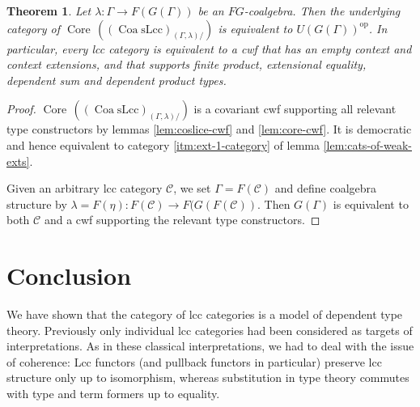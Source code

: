 \documentclass[a4paper]{article}
\newtheorem{theorem}{Theorem}
\theoremstyle{remark}
\theoremstyle{definition}
\begin{document}
\begin{theorem}
  \label{th:context-as-model}
  Let $\lambda : \Gamma \rightarrow F(G(\Gamma))$ be an $FG$-coalgebra.
  Then the underlying category of $\operatorname{Core} \, ((\operatorname{Coa} \mathrm{sLcc})_{(\Gamma, \lambda) /})$ is equivalent to $U(G(\Gamma))^\mathrm{op}$.
  In particular, every lcc category is equivalent to a cwf that has an empty context and context extensions, and that supports finite product, extensional equality, dependent sum and dependent product types.
\end{theorem}
\begin{proof}
  $\operatorname{Core} \, ((\operatorname{Coa} \mathrm{sLcc})_{(\Gamma, \lambda) /})$ is a covariant cwf supporting all relevant type constructors by lemmas \ref{lem:coslice-cwf} and \ref{lem:core-cwf}.
  It is democratic and hence equivalent to category \ref{itm:ext-1-category} of lemma \ref{lem:cats-of-weak-exts}.

  Given an arbitrary lcc category $\mathcal{C}$, we set $\Gamma = F(\mathcal{C})$ and define coalgebra structure by $\lambda = F(\eta) : F(\mathcal{C}) \rightarrow F(G(F(\mathcal{C}))$.
  Then $G(\Gamma)$ is equivalent to both $\mathcal{C}$ and a cwf supporting the relevant type constructors.
\end{proof}

\section{Conclusion}

We have shown that the category of lcc categories is a model of dependent type theory.
Previously only individual lcc categories had been considered as targets of interpretations.
As in these classical interpretations, we had to deal with the issue of coherence:
Lcc functors (and pullback functors in particular) preserve lcc structure only up to isomorphism, whereas substitution in type theory commutes with type and term formers up to equality.
\end{document}
